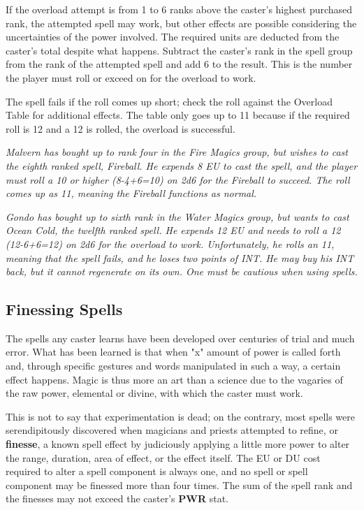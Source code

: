 \begin{multicols*}{2}
If the overload attempt is from 1 to 6 ranks above the caster's highest purchased rank, the attempted spell may work, but other effects are possible considering the uncertainties of the power involved. The required units are
deducted from the caster's total despite what happens. Subtract the caster's rank in the spell group from the rank of the attempted spell and add 6 to the result. This is the number the player must roll or exceed on  for the overload to work.

The spell fails if the roll comes up short; check the roll against the Overload Table for additional effects. The table only goes up to 11 because if the required roll is 12 and a 12 is rolled, the overload is successful.


\textit{Malvern has bought up to rank four in the Fire Magics group, but wishes to cast the eighth ranked spell, Fireball. He expends 8 EU to cast the spell, and the player must roll a 10 or higher (8-4+6=10) on 2d6 for the Fireball to succeed. The roll comes up as 11, meaning the Fireball functions as normal.}

\textit{Gondo has bought up to sixth rank in the Water Magics group, but wants to cast Ocean Cold, the twelfth ranked spell. He expends 12 EU and needs to roll a 12 (12-6+6=12) on 2d6 for the overload to work. Unfortunately, he rolls an 11, meaning that the spell fails, and he loses two points of INT. He may buy his INT back, but it cannot regenerate on its own. One must be cautious when using spells.}
\subsection{Finessing Spells}
The spells any caster learns have been developed over centuries of trial and much error. What has been learned is that when "x" amount of power is called forth and, through specific gestures and words manipulated in such a way, a
certain effect happens. Magic is thus more an art than a science due to the vagaries of the raw power, elemental or divine, with which the caster must work.

This is not to say that experimentation is dead; on the contrary, most spells were serendipitously discovered when magicians and priests attempted to refine, or \textbf{finesse}, a known spell effect by judiciously applying a little more power to alter the range, duration, area of effect, or the effect itself. The EU or DU cost required to alter a spell component is always one, and no spell or spell component may be finessed more than four times. The sum of the spell rank and the finesses may not exceed the caster's \textbf{PWR} stat.


\end{multicols*}
